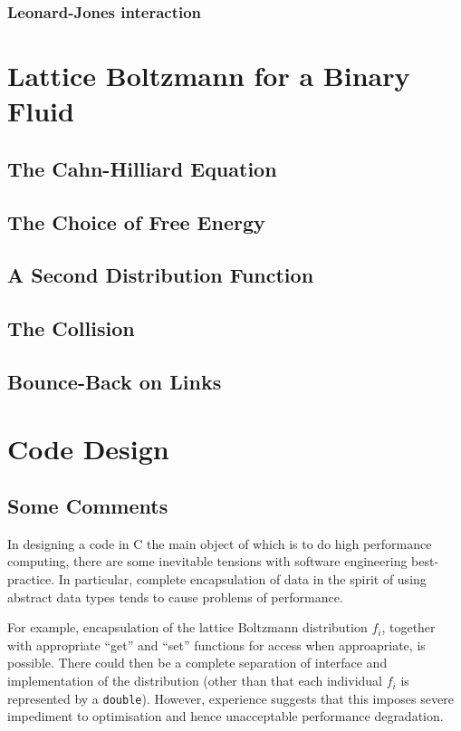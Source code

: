 \subsubsection{Leonard-Jones interaction}



\section{Lattice Boltzmann for a Binary Fluid}

\subsection{The Cahn-Hilliard Equation}

\subsection{The Choice of Free Energy}

\subsection{A Second Distribution Function}

\subsection{The Collision}

\subsection{Bounce-Back on Links}






\section{Code Design}

\subsection{Some Comments}

In designing a code in C the main object of which is to do high
performance computing, there are some inevitable tensions with
software engineering best-practice. In particular, complete
encapsulation of data in the spirit of using abstract data types
tends to cause problems of performance.

For example, encapsulation of the lattice Boltzmann distribution
$f_i$, together with appropriate ``get'' and ``set'' functions for
access when approapriate, is possible. There could then be a
complete separation of interface and implementation of the
distribution (other than that each individual $f_i$ is represented
by a \texttt{double}). However, experience suggests that
this imposes severe impediment to optimisation and hence
unacceptable performance degradation.

